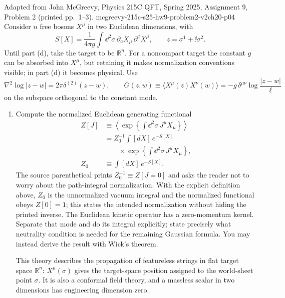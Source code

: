 \begin{enumerate}
  {Adapted from John McGreevy, Physics 215C QFT, Spring 2025,
  Assignment 9, Problem 2 (printed pp.~1--3).}
  {mcgreevy-215c-s25-hw9-problem2-v2ch20-p04}
  Consider \(n\) free bosons \(X^\mu\) in two Euclidean dimensions, with
  \[
    S[X]=\frac{1}{4\pi g}\int \dd^2\sigma\,
      \partial_aX_\mu\,\partial^aX^\mu ,
    \qquad z=\sigma^1+\ii\sigma^2 .
  \]
  Until part (d), take the target to be \(\mathbb R^n\).  For a
  noncompact target the constant \(g\) can be absorbed into \(X^\mu\),
  but retaining it makes normalization conventions visible; in part (d)
  it becomes physical.  Use
  \[
    \nabla^2\log|z-w|=2\pi\delta^{(2)}(z-w),\qquad
    G(z,w)\equiv\langle X^\mu(z)X^\nu(w)\rangle
      =-g\,\delta^{\mu\nu}\log\frac{|z-w|}{\ell}
  \]
  on the subspace orthogonal to the constant mode.
  \begin{enumerate}
    \item[(a)]
    Compute the normalized Euclidean generating functional
    \[
      \begin{aligned}
        Z[J]&\equiv
        \left\langle
          \exp\left\{\int \dd^2\sigma\,J^\mu X_\mu\right\}
        \right\rangle\\
        &=Z_0^{-1}\int[dX]\,e^{-S[X]}\\
        &\qquad\times
          \exp\left\{\int \dd^2\sigma\,J^\mu X_\mu\right\},\\
        Z_0&\equiv\int[dX]\,e^{-S[X]} .
      \end{aligned}
    \]
    The source parenthetical prints
    \(Z_0^{-1}\equiv Z[J=0]\) and asks the reader not to worry about the
    path-integral normalization.  With the explicit definition above,
    \(Z_0\) is the unnormalized vacuum integral and the normalized
    functional obeys \(Z[0]=1\); this states the intended normalization
    without hiding the printed inverse.
    The Euclidean kinetic operator has a zero-momentum kernel.  Separate
    that mode and do its integral explicitly; state precisely what
    neutrality condition is needed for the remaining Gaussian formula.
    You may instead derive the result with Wick's theorem.

    This theory describes the propagation of featureless strings in flat
    target space \(\mathbb R^n\): \(X^\mu(\sigma)\) gives the target-space
    position assigned to the world-sheet point \(\sigma\).  It is also a
    conformal field theory, and a massless scalar in two dimensions has
    engineering dimension zero.


\end{enumerate}
\end{enumerate}
